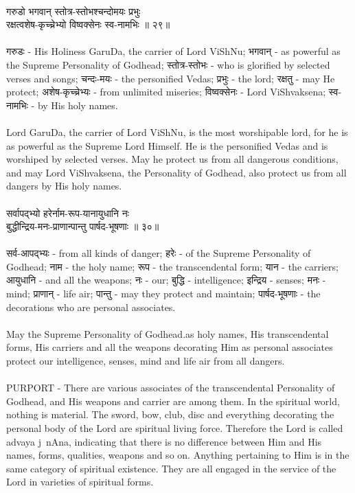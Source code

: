 \\
गरुडो भगवान् स्तोत्र-स्तोभश्चन्दोमयः प्रभुः\\
रक्षत्वशेष-कृच्च्रेभ्यो विष्वक्सेनः स्व-नामभिः ॥ २९॥\\
\\
गरुडः - His Holiness GaruDa, the carrier of Lord ViShNu;  भगवान् - as powerful as the Supreme Personality of Godhead;  स्तोत्र-स्तोभः - who is glorified by selected verses and songs;  चन्दः-मयः - the personified Vedas;  प्रभुः -  the lord;  रक्षतु - may He protect;  अशेष-कृच्च्रेभ्यः - from unlimited miseries;  विष्वक्सेनः - Lord ViShvaksena; स्व-नामभिः - by His holy names.\\
\\
Lord GaruDa, the carrier of Lord ViShNu, is the most worshipable lord, for he is as powerful as the Supreme Lord Himself. He is the personified Vedas and is worshiped by selected verses. May he protect us from all dangerous conditions, and may Lord ViShvaksena, the Personality of Godhead, also protect us from all dangers by His holy names.\\
\\
सर्वापद्भ्यो हरेर्नाम-रूप-यानायुधानि नः\\
बुद्धीन्द्रिय-मनः-प्राणान्पान्तु पार्षद-भूषणाः ॥ ३०॥\\
\\
सर्व-आपद्भ्यः - from all kinds of danger;  हरेः - of the Supreme Personality of Godhead;  नाम - the holy name; रूप - the transcendental form;  यान - the carriers;  आयुधानि - and all the weapons;  नः - our;  बुद्धि -  intelligence; इन्द्रिय - senses;  मनः - mind;  प्राणान् - life air; पान्तु - may they protect and maintain;  पार्षद-भूषणाः - the decorations who are personal associates.\\
\\
May the Supreme Personality of Godhead.as holy names, His transcendental forms, His carriers and all the weapons decorating Him as personal associates protect our intelligence, senses, mind and life air from all dangers.\\
\\
PURPORT - There are various associates of the transcendental Personality of Godhead, and His weapons and carrier are among them. In the spiritual world, nothing is material. The sword, bow, club, disc and everything decorating the personal body of the Lord are spiritual living force. Therefore the Lord is called advaya j~nAna, indicating that there is no difference between Him and His names, forms, qualities, weapons and so on. Anything pertaining to Him is in the same category of spiritual existence. They are all engaged in the service of the Lord in varieties of spiritual forms.\\
